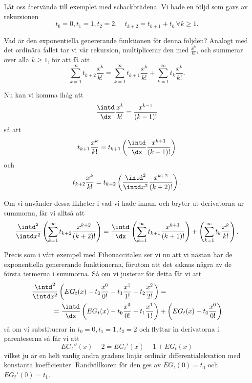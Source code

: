 \documentclass[nobib]{tufte-handout}
\begin{document}
\begin{example}
  Låt oss återvända till exemplet med schackbrädena. Vi hade en följd som gavs av rekursionen
  $$t_0 = 0, t_1 = 1, t_2 = 2, \quad t_{k+2} = t_{k+1} + t_{k} \, \forall k \geq 1.$$

  Vad är den exponentiella genererande funktionen för denna följden? Analogt med det ordinära fallet tar vi vår rekursion, multiplicerar den med $\frac{x^k}{k!}$, och summerar över alla $k \geq 1$, för att få att
  $$\sum_{k=1}^{\infty} t_{k+2} \frac{x^k}{k!} = \sum_{k=1}^{\infty} t_{k+1}\frac{x^k}{k!} + \sum_{k=1}^{\infty} t_{k}\frac{x^k}{k!}.$$

  Nu kan vi komma ihåg att
  $$\frac{\intd}{\dx} \frac{x^k}{k!} = \frac{x^{k-1}}{(k-1)!}$$
  så att
  $$t_{k+1}\frac{x^k}{k!} = t_{k+1}\left(\frac{\intd}{\dx} \frac{x^{k+1}}{(k+1)!}\right)$$
  och
  $$t_{k+2}\frac{x^k}{k!} = t_{k+2}\left(\frac{\intd^2}{\intd x^2} \frac{x^{k+2}}{(k+2)!}\right).$$

  Om vi använder dessa likheter i vad vi hade innan, och bryter ut derivatorna ur summorna, får vi alltså att
  $$\frac{\intd^2}{\intd x^2}\left(\sum_{k=1}^{\infty} t_{k+2} \frac{x^{k+2}}{(k+2)!}\right) = \frac{\intd}{\dx}\left(\sum_{k=1}^{\infty} t_{k+1}\frac{x^{k+1}}{(k+1)!}\right) + \left(\sum_{k=1}^{\infty} t_{k}\frac{x^k}{k!}\right).$$

  Precis som i vårt exempel med Fibonaccitalen ser vi nu att vi nästan har de exponentiella genererande funktionerna, förutom att det saknas några av de första termerna i summorna. Så om vi justerar för detta får vi att
  \begin{align*}
    \frac{\intd^2}{\intd x^2}\left(EG_t(x) - t_0\frac{x^0}{0!} - t_1\frac{x^1}{1!} - t_2\frac{x^2}{2!}\right) &=\\
    = \frac{\intd}{\dx}\left(EG_t(x) - t_0\frac{x^0}{0!} - t_1\frac{x^1}{1!}\right)& + \left(EG_t(x) - t_0\frac{x^0}{0!}\right)
  \end{align*}
  så om vi substituerar in $t_0 = 0, t_1 = 1, t_2 = 2$ och flyttar in derivatorna i parenteserna så får vi att
  $$EG_t''(x) - 2 = EG_t'(x) - 1 + EG_t(x)$$
  vilket ju är en helt vanlig andra gradens linjär ordinär differentialekvation med konstanta koefficienter. Randvillkoren för den ges av $EG_t(0) = t_0$ och $EG_t'(0) = t_1$.
  

\end{example}
\end{document}
